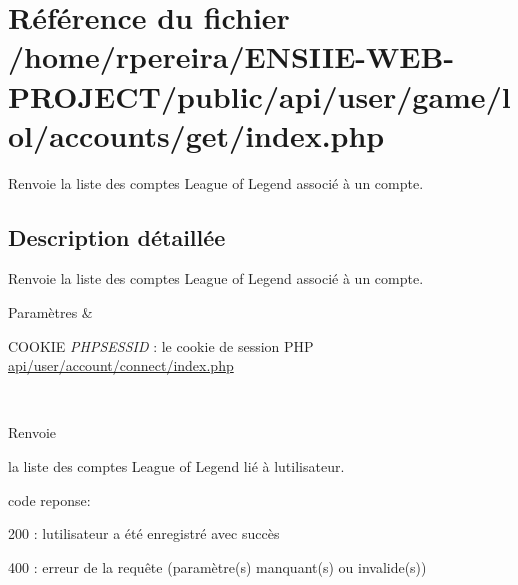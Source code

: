 \hypertarget{game_2lol_2accounts_2get_2index_8php}{}\section{Référence du fichier /home/rpereira/\+E\+N\+S\+I\+I\+E-\/\+W\+E\+B-\/\+P\+R\+O\+J\+E\+C\+T/public/api/user/game/lol/accounts/get/index.php}
\label{game_2lol_2accounts_2get_2index_8php}


Renvoie la liste des comptes League of Legend associé à un compte.  




\subsection{Description détaillée}
Renvoie la liste des comptes League of Legend associé à un compte. 


\begin{DoxyParams}{Paramètres}
{\em } & 
\begin{DoxyItemize}
\item C\+O\+O\+K\+IE {\itshape P\+H\+P\+S\+E\+S\+S\+ID} \+: le cookie de session P\+HP \hyperlink{account_2connect_2index_8php}{api/user/account/connect/index.\+php} 
\end{DoxyItemize}\\
\hline
\end{DoxyParams}
\begin{DoxyReturn}{Renvoie}

\begin{DoxyItemize}
\item la liste des comptes League of Legend lié à l\textquotesingle{}utilisateur.
\item code reponse\+:
\begin{DoxyItemize}
\item 200 \+: l\textquotesingle{}utilisateur a été enregistré avec succès
\item 400 \+: erreur de la requête (paramètre(s) manquant(s) ou invalide(s)) 
\end{DoxyItemize}
\end{DoxyItemize}
\end{DoxyReturn}
